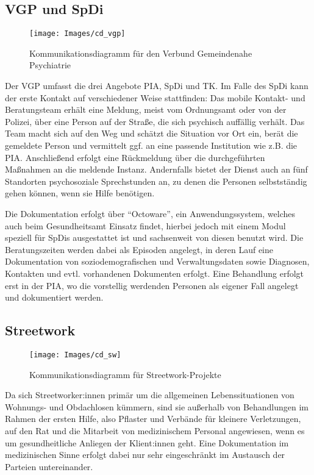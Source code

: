 \subsection{VGP und SpDi}\label{sub:vgp}

\begin{figure}[h]
	\centering
	\texttt{[image: Images/cd\_vgp]}
	\caption[Kommunikationsdiagramm VGP]{Kommunikationsdiagramm für den Verbund Gemeindenahe Psychiatrie}
	\label{fig:cdVGP}
\end{figure}

Der \ac{VGP} umfasst die drei Angebote \acf{PIA}, \acf{SpDi} und \acf{TK}. Im Falle des \ac{SpDi} kann der erste Kontakt auf verschiedener Weise stattfinden: Das mobile Kontakt- und Beratungsteam erhält eine Meldung, meist vom Ordnungsamt oder von der Polizei, über eine Person auf der Straße, die sich psychisch auffällig verhält. Das Team macht sich auf den Weg und schätzt die Situation vor Ort ein, berät die gemeldete Person und vermittelt ggf. an eine passende Institution wie z.B. die \ac{PIA}. Anschließend erfolgt eine Rückmeldung über die durchgeführten Maßnahmen an die meldende Instanz. Andernfalls bietet der Dienst auch an fünf Standorten psychosoziale Sprechstunden an, zu denen die Personen selbstständig gehen können, wenn sie Hilfe benötigen.

Die Dokumentation erfolgt über \enquote{Octoware}, ein Anwendungssystem, welches auch beim Gesundheitsamt Einsatz findet, hierbei jedoch mit einem Modul speziell für \acp{SpDi} ausgestattet ist und sachsenweit von diesen benutzt wird. Die Beratungszeiten werden dabei als Episoden angelegt, in deren Lauf eine Dokumentation von soziodemografischen und Verwaltungsdaten sowie Diagnosen, Kontakten und evtl. vorhandenen Dokumenten erfolgt. Eine Behandlung erfolgt erst in der \ac{PIA}, wo die vorstellig werdenden Personen als eigener Fall angelegt und dokumentiert werden.

\subsection{Streetwork}\label{sub:sw}

\begin{figure}[h]
	\centering
	\texttt{[image: Images/cd\_sw]}
	\caption[Kommunikationsdiagramm Streetwork]{Kommunikationsdiagramm für Streetwork-Projekte}
	\label{fig:cdSW}
\end{figure}

Da sich Streetworker:innen primär um die allgemeinen Lebenssituationen von Wohnungs- und Obdachlosen kümmern, sind sie außerhalb von Behandlungen im Rahmen der ersten Hilfe, also Pflaster und Verbände für kleinere Verletzungen, auf den Rat und die Mitarbeit von medizinischem Personal angewiesen, wenn es um gesundheitliche Anliegen der Klient:innen geht. Eine Dokumentation im medizinischen Sinne erfolgt dabei nur sehr eingeschränkt im Austausch der Parteien untereinander.

